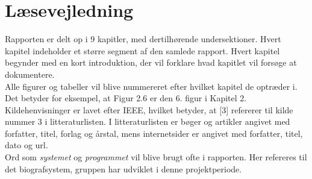 \newpage
\section*{Læsevejledning}
Rapporten er delt op i 9 kapitler, med dertilhørende undersektioner. Hvert kapitel indeholder et større segment af den samlede rapport.
Hvert kapitel begynder med en kort introduktion, der vil forklare hvad kapitlet vil forsøge at dokumentere.\\ 

Alle figurer og tabeller vil blive nummereret efter hvilket kapitel de optræder i. Det betyder for eksempel, at Figur 2.6 er den 
6. figur i Kapitel 2. \\

Kildehenvisninger er lavet efter IEEE, hvilket betyder, at [3] refererer til kilde nummer 3 i litteraturlisten. 
I litteraturlisten er bøger og artikler angivet med forfatter, titel, forlag og årstal, mens internetsider er angivet med forfatter, titel, dato og url. \\ 

Ord som \textit{systemet} og \textit{programmet} vil blive brugt ofte i rapporten. Her refereres til det biografsystem, gruppen har udviklet i denne projektperiode.